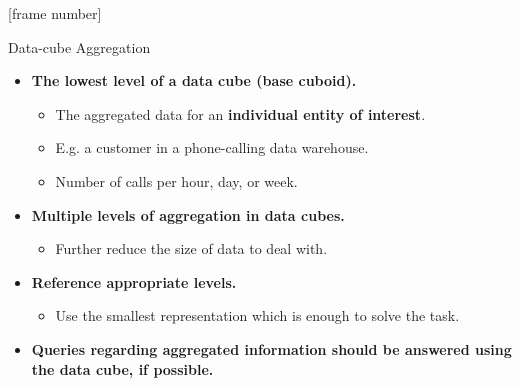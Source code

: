 \documentclass[aspectratio=169,t]{beamer}
\begin{document}
  {
    [frame number]
    \begin{frame}{Data-cube Aggregation}
        \begin{itemize}
            \item \textbf{The lowest level of a data cube (base cuboid).}
            \begin{itemize}
              \item The aggregated data for an \textbf{individual entity of interest}.
              \item E.g. a customer in a phone-calling data warehouse.
              \item Number of calls per hour, day, or week.
            \end{itemize}
            \item \textbf{Multiple levels of aggregation in data cubes.}
            \begin{itemize}
              \item Further reduce the size of data to deal with.
            \end{itemize}
            \item \textbf{Reference appropriate levels.}
            \begin{itemize}
              \item Use the smallest representation which is enough to solve the task.
            \end{itemize}
            \item \textbf{Queries regarding aggregated information should be answered using the data cube, if possible.}
        \end{itemize}
    \end{frame}
  }
\end{document}
